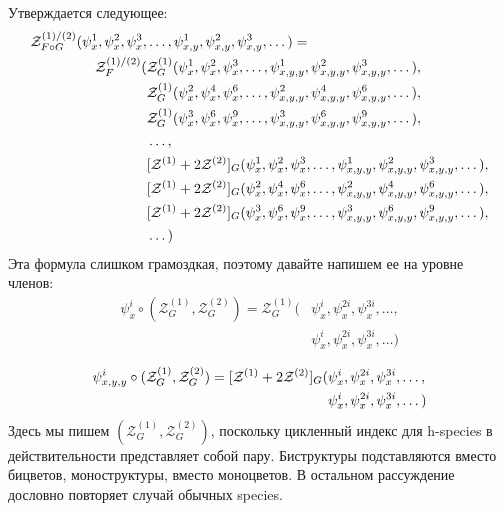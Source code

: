 Утверждается следующее:
\begin{equation}
\begin{split}
\label{eq:h-zfg}
	\mathcal Z^{(1)/(2)}_{F \circ G} (\psi_x^1, \psi_x^2, \psi_x^3, &\dots, 
	\psi_{x,y}^1, \psi_{x,y}^2, \psi_{x,y}^3, \dots) = \\
	\mathcal Z_F^{(1)/(2)}(
		&\mathcal Z^{(1)}_G(\psi_x^1, \psi_x^2, \psi_x^3, \dots, 
					 \psi_{x, y, y}^1, \psi_{x, y, y}^2, \psi_{x, y, y}^3, \dots), \\
		&\mathcal Z^{(1)}_G(\psi_x^2, \psi_x^4, \psi_x^6, \dots, 
					 \psi_{x, y, y}^2, \psi_{x, y, y}^4, \psi_{x, y, y}^6, \dots), \\
		&\mathcal Z^{(1)}_G(\psi_x^3, \psi_x^6, \psi_x^9, \dots, 
					 \psi_{x, y, y}^3, \psi_{x, y, y}^6, \psi_{x, y, y}^9, \dots), \\
		&\dots, \\
		&[\mathcal Z^{(1)} + 2\mathcal Z^{(2)}]_G(\psi_x^1, \psi_x^2, \psi_x^3, \dots, 
					 \psi_{x,y,y}^1, \psi_{x,y,y}^2, \psi_{x,y,y}^3, \dots), \\
		&[\mathcal Z^{(1)} + 2\mathcal Z^{(2)}]_G(\psi_x^2, \psi_x^4, \psi_x^6, \dots, 
					 \psi_{x,y,y}^2, \psi_{x,y,y}^4, \psi_{x,y,y}^6, \dots), \\
		&[\mathcal Z^{(1)} + 2\mathcal Z^{(2)}]_G(\psi_x^3, \psi_x^6, \psi_x^9, \dots, 
					 \psi_{x,y,y}^3, \psi_{x,y,y}^6, \psi_{x,y,y}^9, \dots), \\
		&\dots
	)
\end{split}	
\end{equation}
Эта формула слишком грамоздкая, поэтому давайте напишем ее на уровне членов:
\begin{equation*}
\begin{split}
\psi_x^i \circ (\mathcal Z^{(1)}_G, \mathcal Z^{(2)}_G ) = \mathcal Z^{(1)}_G
(&\psi_x^i, \psi_x^{2i}, \psi_x^{3i}, \dots, \\
&\psi_x^i, \psi_x^{2i}, \psi_x^{3i}, \dots)
\end{split}
\end{equation*}

\begin{equation*}
\begin{split}
\psi_{x,y,y}^i \circ (\mathcal Z^{(1)}_G, \mathcal Z^{(2)}_G ) = [\mathcal Z^{(1)} + 2\mathcal Z^{(2)}]_G
(&\psi_x^i, \psi_x^{2i}, \psi_x^{3i}, \dots, \\
&\psi_x^i, \psi_x^{2i}, \psi_x^{3i}, \dots)
\end{split}
\end{equation*}
Здесь мы пишем $(\mathcal Z^{(1)}_G, \mathcal Z^{(2)}_G )$, поскольку
цикленный индекс для h-species в действительности представляет собой пару.
Биструктуры подставляются вместо бицветов, моноструктуры, вместо моноцветов. В
остальном рассуждение дословно повторяет случай обычных species.

